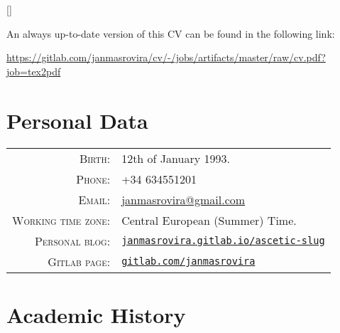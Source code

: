\documentclass[11pt]{article}
\begin{document}
\par{\bigskip\par}
\titleformat{\section}{\Large\scshape\raggedright}{}{0em}{}[\titlerule]

An always up-to-date version of this CV can be found in the following link:
\begin{center}
\url{https://gitlab.com/janmasrovira/cv/-/jobs/artifacts/master/raw/cv.pdf?job=tex2pdf}
\end{center}

\section{Personal Data}

\begin{tabular}{rl}
\textsc{Birth:} & 12th of January 1993.\\
\textsc{Phone:} & +34 634551201\\
\textsc{Email:} & \href{mailto:janmasrovira@gmail.com}{janmasrovira@gmail.com} \\
\textsc{Working time zone:} & Central European (Summer) Time.  \\
\textsc{Personal blog:} & \href{https://janmasrovira.gitlab.io/ascetic-slug/}{\texttt{janmasrovira.gitlab.io/ascetic-slug}} \\
  \textsc{Gitlab page:} & \href{https://gitlab.com/janmasrovira}{\texttt{gitlab.com/janmasrovira}}
\end{tabular}

\section{Academic History}
\end{document}
